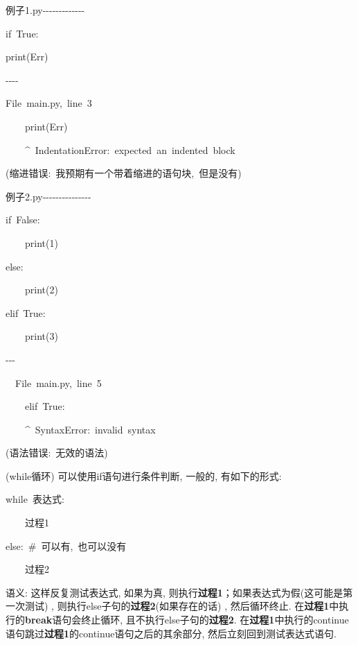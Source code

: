 \begin{lyxcode}
例子1.py-{}-{}-{}-{}-{}-{}-{}-{}-{}-{}-{}-{}-

if~True:

print(\textquotedbl Err\textquotedbl )

-{}-{}-{}-

File~\textquotedbl main.py\textquotedbl ,~line~3

~~~~print(\textquotedbl Err\textquotedbl )

~~~~\textasciicircum ~IndentationError:~expected~an~indented~block

(缩进错误:~我预期有一个带着缩进的语句块,~但是没有)

例子2.py-{}-{}-{}-{}-{}-{}-{}-{}-{}-{}-{}-{}-{}-{}-

if~False:

~~~~print(1)

else:

~~~~print(2)

elif~True:

~~~~print(3)

-{}-{}-

~~File~\textquotedbl main.py\textquotedbl ,~line~5

~~~~elif~True:

~~~~\textasciicircum ~SyntaxError:~invalid~syntax

(语法错误:~无效的语法)
\end{lyxcode}
\begin{definition}
(while循环) 可以使用if语句进行条件判断, 一般的, 有如下的形式:

\noindent\begin{minipage}[t]{1\columnwidth}%
\begin{lyxcode}
while~表达式:

~~~~过程1

else:~\#~可以有,~也可以没有

~~~~过程2
\end{lyxcode}
%
\end{minipage}
\end{definition}
语义: 这样反复测试表达式, 如果为真, 则执行\textbf{过程1}；如果表达式为假(这可能是第一次测试) , 则执行else子句的\textbf{过程2}(如果存在的话)
, 然后循环终止. 在\textbf{过程1}中执行的\textbf{break}语句会终止循环, 且不执行else子句的\textbf{过程2}.
在\textbf{过程1}中执行的continue语句跳过\textbf{过程1}的continue语句之后的其余部分, 然后立刻回到测试表达式语句. 

